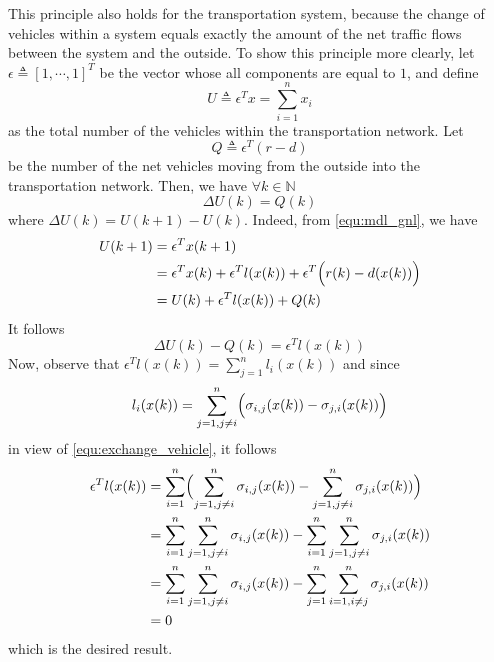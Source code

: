 \documentclass[trsc,nonblindrev]{informs3} %
\renewcommand{\vec}[1]{#1}
\begin{document}
This principle also holds for the transportation system, because the
change of vehicles within a system equals exactly the amount of the
net traffic flows between the system and the outside. To show this
principle more clearly, 
let $\vec{\epsilon} \triangleq [1,\cdots,1]^T$ be the vector whose
all components are equal to $1$, and define
\begin{equation}\label{equ:total_vehicle}
U \triangleq \vec{\epsilon}^T\vec{x}=\sum_{i=1}^n x_i
\end{equation}
as the total number of the vehicles within the transportation
network. Let
\begin{equation}\label{equ:all_io}
Q \triangleq \vec{\epsilon}^T(\vec{r}-\vec{d})
\end{equation}
be the number of the net vehicles moving from the outside into the
transportation network. Then, we have $\forall k\in\mathbb{N}$
\begin{equation}\label{equ:conservation}
\Delta U(k) = Q(k)
\end{equation}
where $\Delta U(k)=U(k+1)-U(k)$.
Indeed, from \eqref{equ:mdl_gnl}, we have
\begin{align*}
U(k+1) &= \vec{\epsilon}^T\vec{x}(k+1)\\
       &=
\vec{\epsilon}^T\vec{x}(k)+\vec{\epsilon}^T\vec{l}(\vec{x}(k))
+\vec{\epsilon}^T\Bigl(\vec{r}(k)-\vec{d}(\vec{x}(k))\Bigr)\\
       &= U(k)+\vec{\epsilon}^T\vec{l}(\vec{x}(k))+Q(k)
\end{align*}
It follows
$$\Delta U(k)-Q(k) = \vec{\epsilon}^T\vec{l}(\vec{x}(k))$$
Now, observe that $\vec{\epsilon}^T\vec{l}(\vec{x}(k)) =\displaystyle
\sum_{j=1}^{n} l_i(\vec{x}(k))$ and since 
$$l_i(\vec{x}(k))=\displaystyle\sum_{j=1,j\neq
i}^{n}\Bigl(\sigma_{i,j}(\vec{x}(k))-\sigma_{j,i}(\vec{x}(k))\Bigr)$$
 in view of
\eqref{equ:exchange_vehicle}, it follows
\begin{align*}
\vec{\epsilon}^T\vec{l}(\vec{x}(k))
    &= \sum_{i=1}^n \Bigl(\sum_{j=1,j\neq i}^{n} \sigma_{i,j}(\vec{x}(k))
       -\sum_{j=1,j\neq i}^{n} \sigma_{j,i}(\vec{x}(k))\Bigr)\\
    &= \sum_{i=1}^n \sum_{j=1,j\neq i}^{n} \sigma_{i,j}(\vec{x}(k))
       -\sum_{i=1}^n \sum_{j=1,j\neq i}^{n} \sigma_{j,i}(\vec{x}(k))\\
    &= \sum_{i=1}^n \sum_{j=1,j\neq i}^{n} \sigma_{i,j}(\vec{x}(k))
       -\sum_{j=1}^n \sum_{i=1,i\neq j}^{n} \sigma_{j,i}(\vec{x}(k))\\
    &= 0
\end{align*}
which is the desired result.
\end{document}
